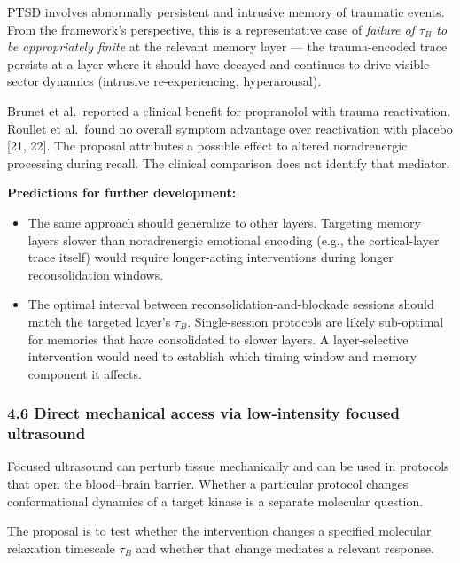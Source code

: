 \documentclass[
]{article}
\providecommand{\tightlist}{%
  \setlength{\itemsep}{0pt}\setlength{\parskip}{0pt}}
\begin{document}
PTSD involves abnormally persistent and intrusive memory of traumatic
events. From the framework's perspective, this is a representative case
of \emph{failure of \(\tau_B\) to be appropriately finite} at the
relevant memory layer --- the trauma-encoded trace persists at a layer
where it should have decayed and continues to drive visible-sector
dynamics (intrusive re-experiencing, hyperarousal).

Brunet et al.~reported a clinical benefit for propranolol with trauma
reactivation. Roullet et al.~found no overall symptom advantage over
reactivation with placebo {[}21, 22{]}. The proposal attributes a
possible effect to altered noradrenergic processing during recall. The
clinical comparison does not identify that mediator.

\textbf{Predictions for further development:}

\begin{itemize}
\tightlist
\item
  The same approach should generalize to other layers. Targeting memory
  layers slower than noradrenergic emotional encoding (e.g., the
  cortical-layer trace itself) would require longer-acting interventions
  during longer reconsolidation windows.
\item
  The optimal interval between reconsolidation-and-blockade sessions
  should match the targeted layer's \(\tau_B\). Single-session protocols
  are likely sub-optimal for memories that have consolidated to slower
  layers. A layer-selective intervention would need to establish which
  timing window and memory component it affects.
\end{itemize}

\hypertarget{direct-mechanical-access-via-low-intensity-focused-ultrasound}{%
\subsubsection{4.6 Direct mechanical access via low-intensity focused
ultrasound}\label{direct-mechanical-access-via-low-intensity-focused-ultrasound}}

Focused ultrasound can perturb tissue mechanically and can be used in
protocols that open the blood--brain barrier. Whether a particular
protocol changes conformational dynamics of a target kinase is a
separate molecular question.

The proposal is to test whether the intervention changes a specified
molecular relaxation timescale \(\tau_B\) and whether that change
mediates a relevant response.
\end{document}
